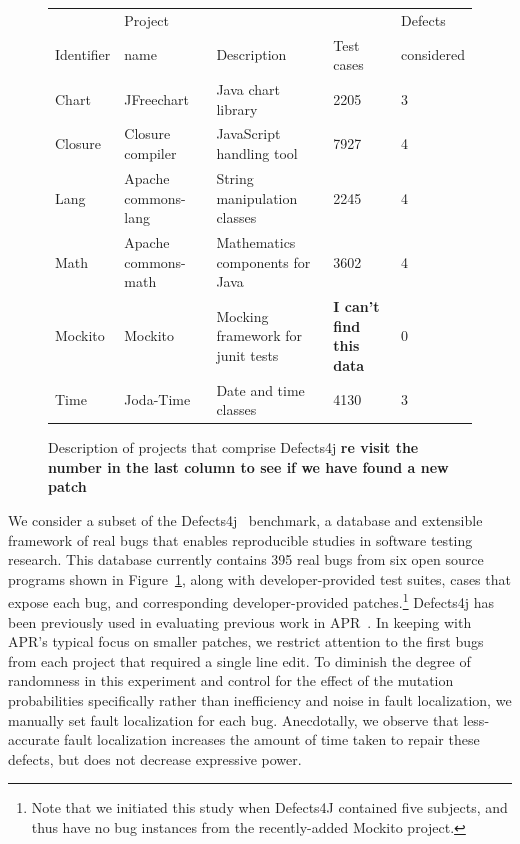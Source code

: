 \documentclass[conference]{IEEEtran}
\newcommand{\todo}[1]
  {{\scriptsize \textbf{\color{red} {#1}}}}
\begin{document}
\begin{figure}[ht]
\centering

\begin{tabular}{lllll}
\toprule
           &   Project  &             &   &  Defects\\
Identifier &    name & Description & Test cases & considered \\
\midrule
Chart & JFreechart & Java chart library & 2205 & 3\\
Closure	& Closure compiler	 & JavaScript handling tool & 7927 & 4\\
Lang	& Apache commons-lang & String manipulation classes  & 2245 & 4\\
Math	& Apache commons-math & Mathematics components for Java & 3602 & 4\\
Mockito &	Mockito	 & Mocking framework for junit tests & \todo{I can't find this data} & 0 \\
Time	& Joda-Time & Date and time classes  & 4130 & 3\\
\bottomrule
\end{tabular}
\center
  \caption{Description of projects that comprise Defects4j \todo{re visit the number in the last column to see if we have found a new patch}}
  \label{defects4j}
\end{figure} 

We consider a subset of the Defects4j~\cite{just14}
benchmark, a database and extensible 
framework of real bugs that enables reproducible studies in software testing 
research. This database currently contains 395 real bugs from six
open source programs shown in Figure~\ref{defects4j}, along with developer-provided test suites, cases that
expose each bug,  and
corresponding developer-provided patches.\footnote{Note that we initiated this study when Defects4J
  contained five subjects, and thus have no bug instances from the recently-added
  Mockito project.} Defects4j has been previously used
in evaluating previous work in APR~\cite{Durieux15}.
In keeping with APR's typical focus on smaller patches, we
restrict attention to the first bugs from each project that required a 
single line edit.
To diminish the degree of randomness in this experiment and control for the
effect of the mutation probabilities specifically rather than inefficiency and noise
in fault localization,  we manually
set fault localization for each bug. Anecdotally, we observe that less-accurate fault localization increases the amount of
time taken to repair these defects, but does not decrease expressive power. 
\end{document}
